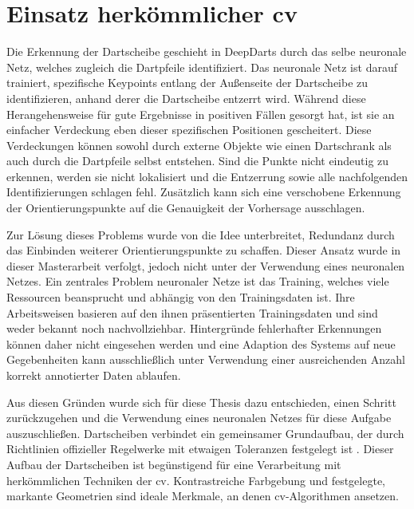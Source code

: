 


\section{Einsatz herkömmlicher \acl{cv}}
\label{sec:einsatz_cv}

Die Erkennung der Dartscheibe geschieht in DeepDarts durch das selbe neuronale Netz, welches zugleich die Dartpfeile identifiziert. Das neuronale Netz ist darauf trainiert, spezifische Keypoints entlang der Außenseite der Dartscheibe zu identifizieren, anhand derer die Dartscheibe entzerrt wird. Während diese Herangehensweise für gute Ergebnisse in positiven Fällen gesorgt hat, ist sie an einfacher Verdeckung eben dieser spezifischen Positionen gescheitert. Diese Verdeckungen können sowohl durch externe Objekte wie einen Dartschrank als auch durch die Dartpfeile selbst entstehen. Sind die Punkte nicht eindeutig zu erkennen, werden sie nicht lokalisiert und die Entzerrung sowie alle nachfolgenden Identifizierungen schlagen fehl. Zusätzlich kann sich eine verschobene Erkennung der Orientierungspunkte auf die Genauigkeit der Vorhersage ausschlagen.

Zur Lösung dieses Problems wurde von \citeauthor{deepdarts} die Idee unterbreitet, Redundanz durch das Einbinden weiterer Orientierungspunkte zu schaffen. Dieser Ansatz wurde in dieser Masterarbeit verfolgt, jedoch nicht unter der Verwendung eines neuronalen Netzes. Ein zentrales Problem neuronaler Netze ist das Training, welches viele Ressourcen beansprucht und abhängig von den Trainingsdaten ist. Ihre Arbeitsweisen basieren auf den ihnen präsentierten Trainingsdaten und sind weder bekannt noch nachvollziehbar. Hintergründe fehlerhafter Erkennungen können daher nicht eingesehen werden und eine Adaption des Systems auf neue Gegebenheiten kann ausschließlich unter Verwendung einer ausreichenden Anzahl korrekt annotierter Daten ablaufen.

Aus diesen Gründen wurde sich für diese Thesis dazu entschieden, einen Schritt zurückzugehen und die Verwendung eines neuronalen Netzes für diese Aufgabe auszuschließen. Dartscheiben verbindet ein gemeinsamer Grundaufbau, der durch Richtlinien offizieller Regelwerke mit etwaigen Toleranzen festgelegt ist \cite{wdf-rules,pdc_rules}. Dieser Aufbau der Dartscheiben ist begünstigend für eine Verarbeitung mit herkömmlichen Techniken der \ac{cv}. Kontrastreiche Farbgebung und festgelegte, markante Geometrien sind ideale Merkmale, an denen \ac{cv}-Algorithmen ansetzen.

